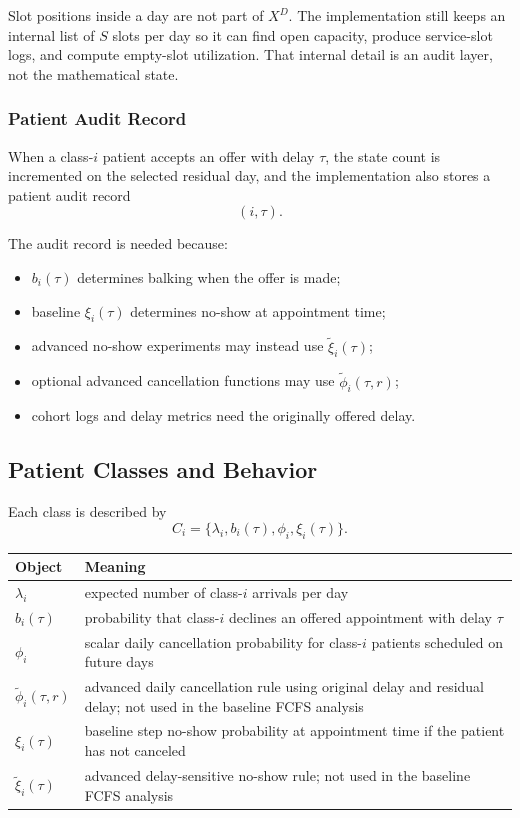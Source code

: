 \documentclass[11pt]{article}
\begin{document}
Slot positions inside a day are not part of \(X^D\). The implementation still keeps an internal
list of \(S\) slots per day so it can find open capacity, produce service-slot logs, and compute
empty-slot utilization. That internal detail is an audit layer, not the mathematical state.

\subsubsection{Patient Audit Record}

When a class-\(i\) patient accepts an offer with delay \(\tau\), the state count is incremented on
the selected residual day, and the implementation also stores a patient audit record
\[
(i,\tau).
\]

The audit record is needed because:
\begin{itemize}[nosep]
    \item \(b_i(\tau)\) determines balking when the offer is made;
    \item baseline \(\xi_i(\tau)\) determines no-show at appointment time;
    \item advanced no-show experiments may instead use \(\tilde{\xi}_i(\tau)\);
    \item optional advanced cancellation functions may use \(\tilde{\phi}_i(\tau,r)\);
    \item cohort logs and delay metrics need the originally offered delay.
\end{itemize}

\subsection{Patient Classes and Behavior}

Each class is described by
\[
C_i=\{\lambda_i,b_i(\tau),\phi_i,\xi_i(\tau)\}.
\]

\begin{center}
\small
\begin{tabular}{L{0.22\textwidth} L{0.68\textwidth}}
\toprule
\textbf{Object} & \textbf{Meaning} \\
\midrule
\(\lambda_i\) & expected number of class-\(i\) arrivals per day \\
\addlinespace
\(b_i(\tau)\) & probability that class-\(i\) declines an offered appointment with delay \(\tau\) \\
\addlinespace
\(\phi_i\) & scalar daily cancellation probability for class-\(i\) patients scheduled on future days \\
\addlinespace
\(\tilde{\phi}_i(\tau,r)\) & advanced daily cancellation rule using original delay and residual delay; not used in the baseline FCFS analysis \\
\addlinespace
\(\xi_i(\tau)\) & baseline step no-show probability at appointment time if the patient has not canceled \\
\addlinespace
\(\tilde{\xi}_i(\tau)\) & advanced delay-sensitive no-show rule; not used in the baseline FCFS analysis \\
\bottomrule
\end{tabular}
\normalsize
\end{center}
\end{document}
